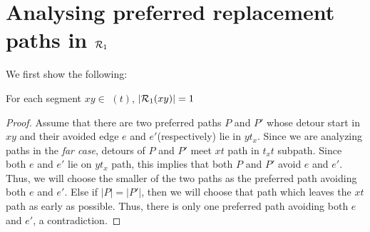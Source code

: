 \begin{comment}
\section{Analysing preferred paths in $\TZE$}
For each segment $xy$ in \SBFS$(t)$ (with $y$ closer to $t$ than $x$),
we store the shortest path from $x$ to $t$ avoiding vertex $y$ (and $t_x$)
in $\TZE(xy)$. Note that the size of $|\ \{ \TZE(xy) |\ xy \ \text{is a segment in \SBFS($t$)} \}|$
is $O(\sigma) = O(\sqrt{n \sigma})$.

However, this data-structure in itself will not be able to answer query
$\QQ(s,t,u)$ where $u$ is an intersection point. We will expand  say
more on this issue in the next section.
\end{comment}

\iflong
\else
\vspace{-2mm}
\fi
\section{Analysing preferred replacement paths in $\mathcal{R}_1$}
\label{sec:multi1}
We first show the following:
\begin{lemma}
\label{lem:allsame}
For each segment $xy \in$ \SBFS$(t)$, $|\mathcal{R}_1(xy)| = 1$
\end{lemma}
\iflong
\begin{proof}
  Assume that there are two preferred paths
   $P$ and $P'$ whose detour start in $xy$ and their avoided edge $e$ and
  $e'$(respectively) lie in $yt_x$. Since we are analyzing
  paths in the {\em far case},  detours of $P$ and $P'$ meet $xt$ path in $t_xt$ subpath.
  Since both $e$ and $e'$ lie on $yt_x$ path,
  this implies that both $P$ and $P'$ avoid $e$ and $e'$.
  Thus, we will choose the smaller of the two paths as the preferred path avoiding both
  $e$ and $e'$. Else if $|P| = |P'|$, then we will choose that path which leaves the $xt$
  path as early as possible. Thus, there is only one preferred path avoiding both
  $e$ and $e'$, a contradiction.
  \end{proof}
\fi

